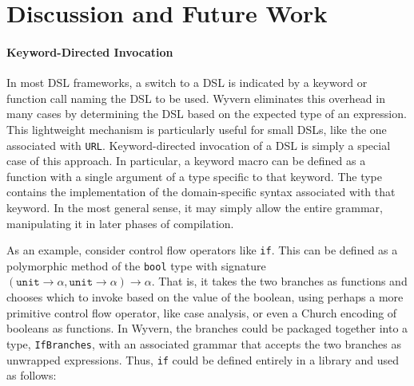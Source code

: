 






\section{Discussion and Future Work}\label{s:discussion}
\paragraph{Keyword-Directed Invocation}
In most DSL frameworks, a switch to a DSL is indicated by a keyword or function call naming the DSL to be used. Wyvern eliminates this overhead in many cases by determining the DSL based on the expected type of an expression. This lightweight mechanism is particularly useful for small DSLs, like the one associated with \lstinline{URL}. Keyword-directed invocation of a DSL is simply a special case of this approach. In particular, a keyword macro can be defined as a function with a single argument of a type specific to that keyword. The type contains the implementation of the domain-specific syntax associated with that keyword. In the most general sense, it may simply allow the entire  grammar, manipulating it in later phases of compilation. 

As an example, consider control flow operators like \verb|if|. This can be defined as a polymorphic method of the \verb|bool| type with signature $(\texttt{unit} \rightarrow \alpha, \texttt{unit} \rightarrow \alpha) \rightarrow \alpha$. That is, it takes the two branches as functions and chooses which to invoke based on the value of the boolean, using perhaps a more primitive control flow operator, like case analysis, or even a Church encoding of booleans as functions. In Wyvern, the branches could be packaged together into a type, \verb|IfBranches|, with an associated grammar that accepts the two branches as unwrapped expressions. Thus, \verb|if| could be defined entirely in a library and used as follows: 

